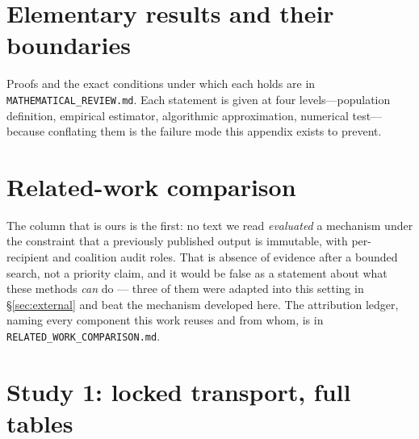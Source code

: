 \documentclass[10pt]{article}
\begin{document}
\appendix
\clearpage

\section{Elementary results and their boundaries}
\label{app:math}
\noindent Proofs and the exact conditions under which each holds are in
\texttt{MATHEMATICAL\_REVIEW.md}. Each statement is given at four levels---population definition,
empirical estimator, algorithmic approximation, numerical test---because conflating them is the
failure mode this appendix exists to prevent.

\section{Related-work comparison}
\label{app:related}

\begin{table}[h]
\centering\small

\caption{The five features this paper's setting turns on. \noteRelatedWork}
\label{tab:related}
\end{table}

\noindent The column that is ours is the first: no text we read \emph{evaluated} a mechanism under
the constraint that a previously published output is immutable, with per-recipient and coalition
audit roles. That is absence of evidence after a bounded search, not a priority claim, and it would
be false as a statement about what these methods \emph{can} do --- three of them were adapted into
this setting in \S\ref{sec:external} and beat the mechanism developed here. The attribution ledger,
naming every component this work reuses and from whom, is in
\texttt{RELATED\_WORK\_COMPARISON.md}.

\section{Study 1: locked transport, full tables}
\label{app:study1}
\begin{center}\small\end{center}
\begin{center}\small\end{center}
\begin{center}\small\end{center}
\begin{center}\small\end{center}
\begin{center}\small\end{center}
\begin{center}\small\end{center}
\end{document}
